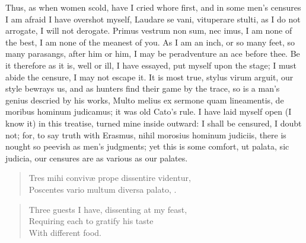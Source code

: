 {Thus, as when women scold, have I cried whore first, and in some men's
censures I am afraid I have overshot myself, Laudare se vani,
vituperare stulti, as I do not arrogate, I will not derogate. Primus
vestrum non sum, nec imus, I am none of the best, I am none of the
meanest of you. As I am an inch, or so many feet, so many parasangs,
after him or him, I may be peradventure an ace before thee. Be it
therefore as it is, well or ill, I have essayed, put myself upon the
stage; I must abide the censure, I may not escape it. It is most true,
stylus virum arguit, our style bewrays us, and as hunters find
their game by the trace, so is a man's genius descried by his works,
Multo melius ex sermone quam lineamentis, de moribus hominum judicamus;
it was old Cato's rule. I have laid myself open (I know it) in this
treatise, turned mine inside outward: I shall be censured, I doubt not;
for, to say truth with Erasmus, nihil morosius hominum judiciis, there
is nought so peevish as men's judgments; yet this is some comfort, ut
palata, sic judicia, our censures are as various as our palates.

\begin{verse}
\textlatin{Tres mihi conviv\ae{} prope dissentire videntur},\\
\textlatin{Poscentes vario multum diversa palato, \etc.}
\end{verse}

\begin{verse}
Three guests I have, dissenting at my feast,\\
Requiring each to gratify his taste\\
With different food.
\end{verse}

}
